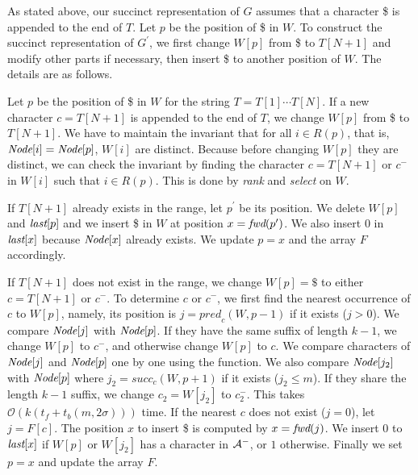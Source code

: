 \documentclass{llncs}
\newcommand{\Order}{\mathcal{O}}
\def\rank{\textit{rank}}
\def\select{\textit{select}}
\def\pred{\textit{pred}}
\def\succ{\textit{succ}}
\begin{document}
As stated above, our succinct representation of $G$ assumes that a character \$ is appended
to the end of $T$.  Let $p$ be the position of \$ in $W$.
To construct the succinct representation of $G^\prime$,
we first change $W[p]$ from \$ to $T[N+1]$ and modify other parts if necessary,
then insert \$ to another position of $W$.  The details are as follows.

Let $p$ be the position of \$ in $W$ for the string $T = T[1] \cdots T[N]$.
If a new character $c = T[N+1]$ is appended to the end of $T$, we change $W[p]$ from \$ to $T[N+1]$.
We have to maintain the invariant that for all $i \in R(p)$, that is, ${\textit{Node}}[i] = {\textit{Node}}[p]$,
$W[i]$ are distinct.
Because before changing $W[p]$ they are distinct, we can check the invariant by finding the character
$c = T[N+1]$ or $c^-$ in $W[i]$ such that $i \in R(p)$.  This is done by {\rank} and {\select} on $W$.

If $T[N+1]$ already exists in the range, let $p^\prime$ be its position.
We delete $W[p]$ and ${\textit{last}}[p]$ and we insert \$ in $W$ at position $x = {\textit{fwd}}(p^\prime)$.
We also insert $0$ in ${\textit{last}}[x]$ because ${\textit{Node}}[x]$ already exists.
We update $p = x$ and the array $F$ accordingly.

If $T[N+1]$ does not exist in the range,
we change $W[p] = \$ $ to either $c = T[N+1]$ or $c^-$.
To determine $c$ or $c^-$, we first find the nearest occurrence of $c$ to $W[p]$,
namely, its position is $j = {\pred}_c(W, p-1)$ if it exists ($j > 0$).
We compare ${\textit{Node}}[j]$ with ${\textit{Node}}[p]$.  If they have the same suffix of length $k-1$,
we change $W[p]$ to $c^-$, and otherwise change $W[p]$ to $c$.
We compare characters of ${\textit{Node}}[j]$ and ${\textit{Node}}[p]$ one by one using the {\bwd} function.
We also compare ${\textit{Node}}[j_2]$ with ${\textit{Node}}[p]$ where
$j_2 = {\succ}_c(W, p+1)$ if it exists ($j_2 \le m$).
If they share the length $k-1$ suffix, we change $c_2 = W[j_2]$ to $c_2^-$.
This takes $\Order(k(t_f + t_b(m,2\sigma)))$ time.
If the nearest $c$ does not exist ($j = 0$), let $j = F[c]$.
The position $x$ to insert \$ is computed by $x = {\textit{fwd}}(j)$.
We insert $0$ to ${\textit{last}}[x]$ if $W[p]$ or $W[j_2]$ has a character in ${\cal A}^-$,
or $1$ otherwise.  Finally we set $p = x$ and update the array $F$.
\end{document}
